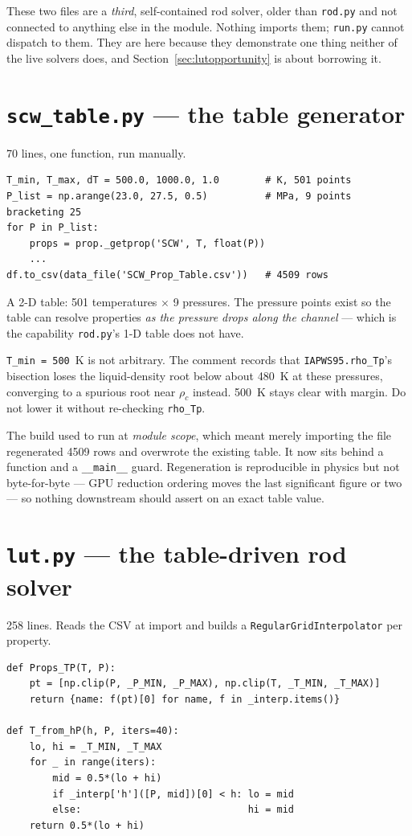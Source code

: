 \documentclass[11pt]{article}
\newcommand{\code}[1]{\texttt{#1}}
\begin{document}
\noindent
These two files are a \emph{third}, self-contained rod solver, older than
\code{rod.py} and not connected to anything else in the module. Nothing imports them;
\code{run.py} cannot dispatch to them. They are here because they demonstrate one thing
neither of the live solvers does, and Section~\ref{sec:lutopportunity} is about borrowing
it.

\section{\code{scw\_table.py} --- the table generator}
70 lines, one function, run manually.

\begin{lstlisting}
T_min, T_max, dT = 500.0, 1000.0, 1.0        # K, 501 points
P_list = np.arange(23.0, 27.5, 0.5)          # MPa, 9 points bracketing 25
for P in P_list:
    props = prop._getprop('SCW', T, float(P))
    ...
df.to_csv(data_file('SCW_Prop_Table.csv'))   # 4509 rows
\end{lstlisting}

A 2-D table: 501 temperatures $\times$ 9 pressures. The pressure points exist so the table
can resolve properties \emph{as the pressure drops along the channel} --- which is the
capability \code{rod.py}'s 1-D table does not have.

\code{T\_min = 500}~K is not arbitrary. The comment records that
\code{IAPWS95.rho\_Tp}'s bisection loses the liquid-density root below about 480~K at
these pressures, converging to a spurious root near $\rho_c$ instead. 500~K stays clear
with margin. Do not lower it without re-checking \code{rho\_Tp}.

The build used to run at \emph{module scope}, which meant merely importing the file
regenerated 4509 rows and overwrote the existing table. It now sits behind a function and
a \code{\_\_main\_\_} guard. Regeneration is reproducible in physics but not
byte-for-byte --- GPU reduction ordering moves the last significant figure or two --- so
nothing downstream should assert on an exact table value.

\section{\code{lut.py} --- the table-driven rod solver}
258 lines. Reads the CSV at import and builds a \code{RegularGridInterpolator} per
property.

\begin{lstlisting}
def Props_TP(T, P):
    pt = [np.clip(P, _P_MIN, _P_MAX), np.clip(T, _T_MIN, _T_MAX)]
    return {name: f(pt)[0] for name, f in _interp.items()}

def T_from_hP(h, P, iters=40):
    lo, hi = _T_MIN, _T_MAX
    for _ in range(iters):
        mid = 0.5*(lo + hi)
        if _interp['h']([P, mid])[0] < h: lo = mid
        else:                             hi = mid
    return 0.5*(lo + hi)
\end{lstlisting}
\end{document}
